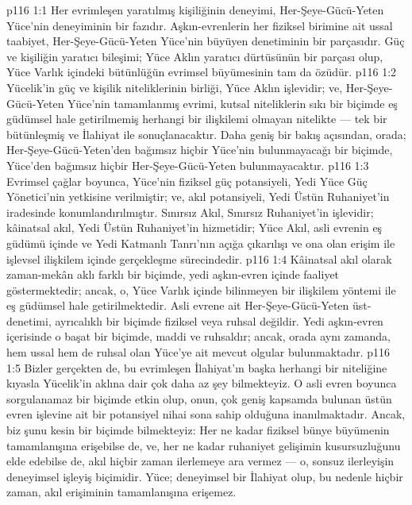 \vs p116 1:1 Her evrimleşen yaratılmış kişiliğinin deneyimi, Her\hyp{}Şeye\hyp{}Gücü\hyp{}Yeten Yüce’nin deneyiminin bir fazıdır. Aşkın\hyp{}evrenlerin her fiziksel birimine ait ussal taabiyet, Her\hyp{}Şeye\hyp{}Gücü\hyp{}Yeten Yüce’nin büyüyen denetiminin bir parçasıdır. Güç ve kişiliğin yaratıcı bileşimi; Yüce Aklın yaratıcı dürtüsünün bir parçası olup, Yüce Varlık içindeki bütünlüğün evrimsel büyümesinin tam da özüdür.
\vs p116 1:2 Yücelik’in güç ve kişilik niteliklerinin birliği, Yüce Aklın işlevidir; ve, Her\hyp{}Şeye\hyp{}Gücü\hyp{}Yeten Yüce’nin tamamlanmış evrimi, kutsal niteliklerin sıkı bir biçimde eş güdümsel hale getirilmemiş herhangi bir ilişkilemi olmayan nitelikte --- tek bir bütünleşmiş ve İlahiyat ile sonuçlanacaktır. Daha geniş bir bakış açısından, orada; Her\hyp{}Şeye\hyp{}Gücü\hyp{}Yeten’den bağımsız hiçbir Yüce’nin bulunmayacağı bir biçimde, Yüce’den bağımsız hiçbir Her\hyp{}Şeye\hyp{}Gücü\hyp{}Yeten bulunmayacaktır.
\vs p116 1:3 Evrimsel çağlar boyunca, Yüce’nin fiziksel güç potansiyeli, Yedi Yüce Güç Yönetici’nin yetkisine verilmiştir; ve, akıl potansiyeli, Yedi Üstün Ruhaniyet’in iradesinde konumlandırılmıştır. Sınırsız Akıl, Sınırsız Ruhaniyet’in işlevidir; kâinatsal akıl, Yedi Üstün Ruhaniyet’in hizmetidir; Yüce Akıl, asli evrenin eş güdümü içinde ve Yedi Katmanlı Tanrı’nın açığa çıkarılışı ve ona olan erişim ile işlevsel ilişkilem içinde gerçekleşme sürecindedir.
\vs p116 1:4 Kâinatsal akıl olarak zaman\hyp{}mekân aklı farklı bir biçimde, yedi aşkın\hyp{}evren içinde faaliyet göstermektedir; ancak, o, Yüce Varlık içinde bilinmeyen bir ilişkilem yöntemi ile eş güdümsel hale getirilmektedir. Asli evrene ait Her\hyp{}Şeye\hyp{}Gücü\hyp{}Yeten üst\hyp{}denetimi, ayrıcalıklı bir biçimde fiziksel veya ruhsal değildir. Yedi aşkın\hyp{}evren içerisinde o başat bir biçimde, maddi ve ruhsaldır; ancak, orada aynı zamanda, hem ussal hem de ruhsal olan Yüce’ye ait mevcut olgular bulunmaktadır.
\vs p116 1:5 Bizler gerçekten de, bu evrimleşen İlahiyat’ın başka herhangi bir niteliğine kıyasla Yücelik’in aklına dair çok daha az şey bilmekteyiz. O asli evren boyunca sorgulanamaz bir biçimde etkin olup, onun, çok geniş kapsamda bulunan üstün evren işlevine ait bir potansiyel nihai sona sahip olduğuna inanılmaktadır. Ancak, biz şunu kesin bir biçimde bilmekteyiz: Her ne kadar fiziksel bünye büyümenin tamamlanışına erişebilse de, ve, her ne kadar ruhaniyet gelişimin kusursuzluğunu elde edebilse de, akıl hiçbir zaman ilerlemeye ara vermez --- o, sonsuz ilerleyişin deneyimsel işleyiş biçimidir. Yüce; deneyimsel bir İlahiyat olup, bu nedenle hiçbir zaman, akıl erişiminin tamamlanışına erişemez.
